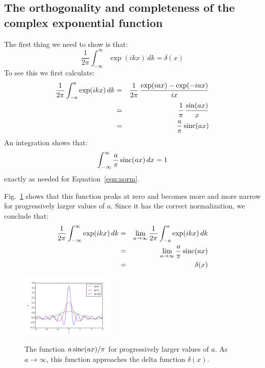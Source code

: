 \documentclass[12pt]{article}
\begin{document}
\subsection{The orthogonality and completeness of the complex exponential function}

The first thing we need to show is that:
\begin{equation}
\frac{1}{2\pi} \int_{-\infty}^{\infty} \exp(ikx) \, dk = \delta(x)
\end{equation}
To see this we first calculate:
\begin{eqnarray*} 
\frac{1}{2\pi} \int_{-a}^{a} \exp(ikx) \, dk &=& \frac{1}{2\pi} \, \frac{\exp(iax)-\exp(-iax)}{ix}\\
&=& \frac{1}{\pi} \, \frac{\sin(ax)}{x} \\
&=& \frac{a}{\pi} \, {\rm sinc}(ax)
\end{eqnarray*}
An integration shows that:
\begin{eqnarray}
\int_{-\infty}^{\infty} \frac{a}{\pi} \, {\rm sinc}(ax) \, dx = 1
\end{eqnarray}
exactly as needed for Equation~\ref{eqn:norm}.

Fig.~\ref{fig:sinc} shows that this function peaks at zero and becomes more and more narrow for progressively larger values of $a$.  Since it has the correct normalization, we conclude that:
\begin{eqnarray}
\frac{1}{2\pi} \int_{-\infty}^{\infty} \exp(ikx) \, dk &=& \lim_{a\to\infty} \frac{1}{2\pi} \int_{-a}^{a} \exp(ikx) \, dk \nonumber \\
&=& \lim_{a\to\infty} \frac{a}{\pi} \, {\rm sinc}(ax) \nonumber \\ 
&=& \delta(x) \label{eqn:delta}
\end{eqnarray}

\begin{figure}[thb]
\begin{center}
{\includegraphics[width=0.40\textwidth]{figs/sinc.png}}
\end{center}
\caption{\label{fig:sinc} The function $a \, {\rm sinc}(ax)/\pi$ for progressively larger values of $a$.  As $a \to \infty$, this function approaches the delta function $\delta(x)$.}
\end{figure}
\end{document}
